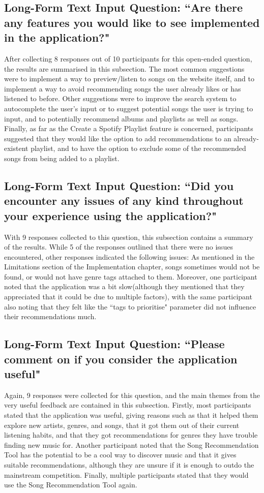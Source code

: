 \documentclass{l4proj}
\begin{document}
\subsection{Long-Form Text Input Question: ``Are there any features you would like to see implemented in the application?"}
After collecting 8 responses out of 10 participants for this open-ended question, the results are summarised in this subsection. The most common suggestions were to implement a way to preview/listen to songs on the website itself, and to implement a way to avoid recommending songs the user already likes or has listened to before. Other suggestions were to improve the search system to autocomplete the user's input or to suggest potential songs the user is trying to input, and to potentially recommend albums and playlists as well as songs. Finally, as far as the Create a Spotify Playlist feature is concerned, participants suggested that they would like the option to add recommendations to an already-existent playlist, and to have the option to exclude some of the recommended songs from being added to a playlist.
\subsection{Long-Form Text Input Question: ``Did you encounter any issues of any kind throughout your experience using the application?"}
With 9 responses collected to this question, this subsection contains a summary of the results. While 5 of the responses outlined that there were no issues encountered, other responses indicated the following issues: As mentioned in the Limitations section of the Implementation chapter, songs sometimes would not be found, or would not have genre tags attached to them. Moreover, one participant noted that the application was a bit slow(although they mentioned that they appreciated that it could be due to multiple factors), with the same participant also noting that they felt like the ``tags to prioritise" parameter did not influence their recommendations much.
\subsection{Long-Form Text Input Question: ``Please comment on if you consider the application useful"}
Again, 9 responses were collected for this question, and the main themes from the very useful feedback are contained in this subsection. Firstly, most participants stated that the application was useful, giving reasons such as that it helped them explore new artists, genres, and songs, that it got them out of their current listening habits, and that they got recommendations for genres they have trouble finding new music for. Another participant noted that the Song Recommendation Tool has the potential to be a cool way to discover music and that it gives suitable recommendations, although they are unsure if it is enough to outdo the mainstream competition. Finally, multiple participants stated that they would use the Song Recommendation Tool again.
\end{document}
